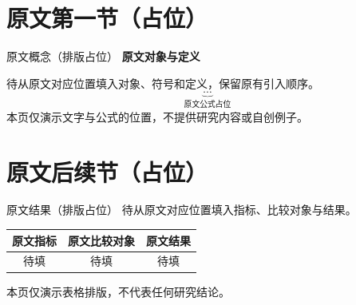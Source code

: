\documentclass[c,11pt,aspectratio=43]{beamer}
\title[\ReportShortTitle]{\ReportTitle}
\subtitle{\ReportEnglishTitle}
\author[\ReportSourceAuthors]{\ReportPresenterDisplay}
\institute[\ReportShortContext]{\ReportContext}
\date{\ReportDate}
\begin{document}
\begin{frame}[c]\titlepage\end{frame}

\section{原文第一节（占位）}
\begin{frame}[c]{原文概念（排版占位）}
{\color{reportaccent}\bfseries 原文对象与定义}

待从原文对应位置填入对象、符号和定义，保留原有引入顺序。
\[
\underbrace{\cdots}_{\text{原文公式占位}}
\]
本页仅演示文字与公式的位置，不提供研究内容或自创例子。
\end{frame}

\section{原文后续节（占位）}
\begin{frame}[c]{原文结果（排版占位）}
待从原文对应位置填入指标、比较对象与结果。
\begin{center}
\renewcommand{\arraystretch}{1.3}
\begin{tabular}{ccc}
\toprule
原文指标 & 原文比较对象 & 原文结果\\
\midrule
待填 & 待填 & 待填\\
\bottomrule
\end{tabular}
\end{center}
\medskip
本页仅演示表格排版，不代表任何研究结论。
\end{frame}
\end{document}
